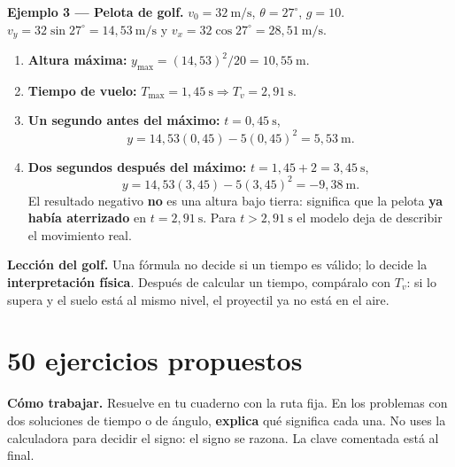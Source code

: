 \documentclass[12pt, letterpaper]{article}
\providecommand{\sen}{\sin}
\begin{document}
\begin{cuadrosolucion}
  \small
  \textbf{Ejemplo 3 — Pelota de golf.} $v_0=32\ \text{m/s}$,
  $\theta=27^\circ$, $g=10$.\\[2pt]
  $v_y=32\sen27^\circ=14{,}53\ \text{m/s}$ y
  $v_x=32\cos27^\circ=28{,}51\ \text{m/s}$.
  \begin{enumerate}[leftmargin=1.4em, nosep, topsep=2pt]
    \item \textbf{Altura máxima:}
          $y_{\max}=(14{,}53)^2/20=10{,}55\ \text{m}$.
    \item \textbf{Tiempo de vuelo:}
          $T_{\max}=1{,}45\ \text{s}\Rightarrow T_v=2{,}91\ \text{s}$.
    \item \textbf{Un segundo antes del máximo:} $t=0{,}45\ \text{s}$,
          \[
            y=14{,}53(0{,}45)-5(0{,}45)^2=5{,}53\ \text{m}.
          \]
    \item \textbf{Dos segundos después del máximo:} $t=1{,}45+2=3{,}45\ \text{s}$,
          \[
            y=14{,}53(3{,}45)-5(3{,}45)^2=-9{,}38\ \text{m}.
          \]
          El resultado negativo \textbf{no} es una altura bajo tierra: significa
          que la pelota \textbf{ya había aterrizado} en $t=2{,}91\ \text{s}$.
          Para $t>2{,}91\ \text{s}$ el modelo deja de describir el movimiento
          real.
  \end{enumerate}
\end{cuadrosolucion}

\begin{cuadroadvertencia}
  \small
  \textbf{Lección del golf.} Una fórmula no decide si un tiempo es válido;
  lo decide la \textbf{interpretación física}. Después de calcular un tiempo,
  compáralo con $T_v$: si lo supera y el suelo está al mismo nivel, el
  proyectil ya no está en el aire.
\end{cuadroadvertencia}

\section{50 ejercicios propuestos}

\begin{cuadroinfo}
  \small
  \textbf{Cómo trabajar.} Resuelve en tu cuaderno con la ruta fija. En los
  problemas con dos soluciones de tiempo o de ángulo, \textbf{explica} qué
  significa cada una. No uses la calculadora para decidir el signo: el signo
  se razona. La clave comentada está al final.
\end{cuadroinfo}
\end{document}
